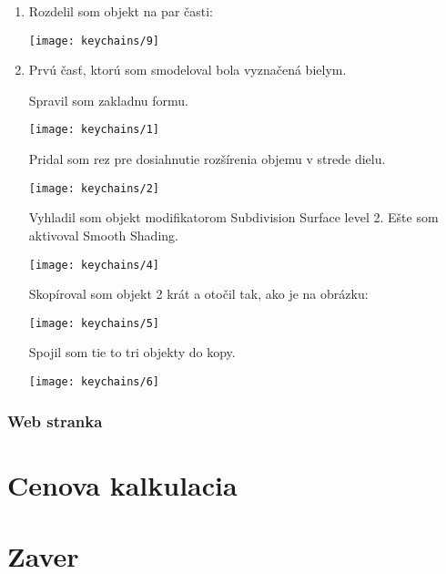       \begin{enumerate}
        \item{
            Rozdelil som objekt na par časti:

            \begin{center}
              \texttt{[image: keychains/9]}
            \end{center}
        }

        \item{
            Prvú časť, ktorú som smodeloval bola vyznačená bielym.

            Spravil som zakladnu formu.

            \texttt{[image: keychains/1]}

            Pridal som rez pre dosiahnutie rozšírenia objemu v strede dielu.

            \texttt{[image: keychains/2]}

            Vyhladil som objekt modifikatorom Subdivision Surface level 2. Ešte som aktivoval Smooth Shading.

            \texttt{[image: keychains/4]}

            Skopíroval som objekt 2 krát a otočil tak, ako je na obrázku:

            \texttt{[image: keychains/5]}

            Spojil som tie to tri objekty do kopy.

            \texttt{[image: keychains/6]}
        }
      \end{enumerate}

      \subsubsection{Web stranka}

  \section{Cenova kalkulacia}

  \section{Zaver}


